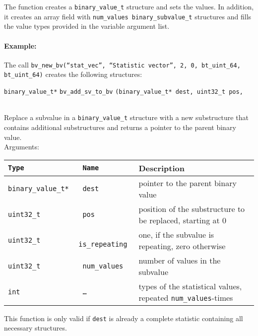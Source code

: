 \documentclass[documentation]{subfiles}
\begin{document}
The function creates a {\tt binary\_value\_t} structure and sets the values. In addition, it creates an array field with {\tt num\_values binary\_subvalue\_t} structures and fills the value types provided in the variable argument list.

\paragraph{Example:} The call {\tt bv\_new\_bv(``stat\_vec'', ``Statistic vector'', 2, 0, bt\_uint\_64, bt\_uint\_64)} creates the following structures:
\begin{figure}[H]
    \centering
\end{figure}

\vspace{18pt}

\begin{tabbing}
\={\tt binary\_value\_t*} \= {\tt bv\_add\_sv\_to\_bv} \={\tt(binary\_value\_t* dest, uint32\_t pos,}\\
\>\> \\
\end{tabbing}
\indent Replace a subvalue in a {\tt binary\_value\_t} structure with a new substructure that contains additional substructures and returns a pointer to the parent binary value.\\[2ex]
Arguments:
\begin{longtable}{>{\tt}l>{\tt}ll}
    \toprule
    {\bf Type}        & {\bf Name}    & {\bf Description} \\
    \midrule\endhead%
    binary\_value\_t* & dest          & pointer to the parent binary value \\
    uint32\_t         & pos           & position of the substructure to be replaced, starting at 0 \\
    uint32\_t         & is\_repeating & one, if the subvalue is repeating, zero otherwise \\
    uint32\_t         & num\_values   & number of values in the subvalue \\
    int               & \ldots        & types of the statistical values, repeated {\tt num\_values}-times \\
    \bottomrule
\end{longtable}

This function is only valid if {\tt dest} is already a complete statistic containing all necessary structures.
\end{document}
